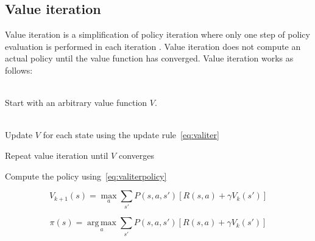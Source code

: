 \subsection{Value iteration}
\label{sec:valueiteration}

Value iteration is a simplification of policy iteration where only one step of policy evaluation is performed in each iteration \parencite{barto1998reinforcement}. Value iteration does not compute an actual policy until the value function has converged. Value iteration works as follows:

\begin{description}
\item[Initialization] \hfill \\
    Start with an arbitrary value function $V$.
\item[Value iteration] \hfill \\
    Update $V$ for each state using the update rule~\eqref{eq:valiter}
\item Repeat value iteration until $V$ converges
\item Compute the policy using~\eqref{eq:valiterpolicy}
\end{description}

\begin{equation} \label{eq:valiter}
V_{k+1}(s) = \max_a \sum_{s'}{P(s, a, s') \left[R(s, a) + \gamma V_k(s')\right]}
\end{equation}

\begin{equation} \label{eq:valiterpolicy}
\pi(s) = \operatorname*{arg\,max}_a \sum_{s'}{P(s, a, s') \left[R(s, a) + \gamma V_k(s')\right]}
\end{equation}

